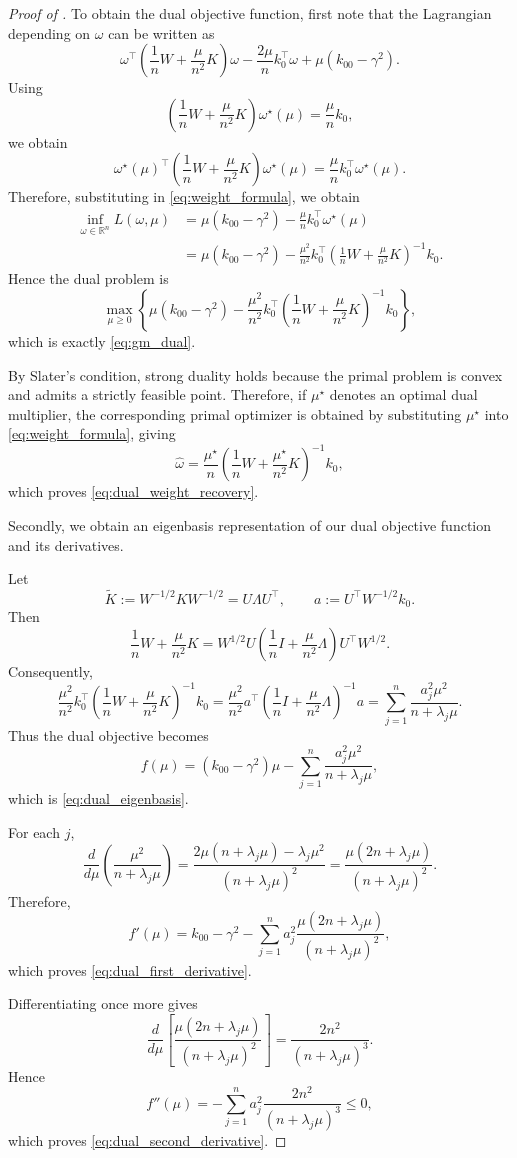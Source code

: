 \documentclass[11pt]{article}
\newcommand{\R}{\mathbb{R}}
\begin{document}
\begin{proof}[Proof of ]
\indent To obtain the dual objective function, first note that
the Lagrangian depending on $\omega$ can be written as
\[
  \omega^\top \left(\frac1nW+\frac\mu{n^2}K \right)\omega
  -
  \frac{2\mu}{n}k_0^\top\omega + \mu(k_{00}-\gamma^2).
\]
Using
\[
  \left(\frac1nW+\frac\mu{n^2}K \right)\omega^\star(\mu)
  =
  \frac\mu n k_0,
\]
we obtain
\[
  \omega^\star(\mu)^\top
  \left(\frac1nW+\frac\mu{n^2}K \right)
  \omega^\star(\mu)
  =
  \frac\mu n
  k_0^\top\omega^\star(\mu).
\]
Therefore, substituting in \eqref{eq:weight_formula}, we obtain 
\begin{align*}
  \inf_{\omega\in\R^n}L(\omega,\mu)
  &=
  \mu(k_{00}-\gamma^2)
  -
  \frac\mu n
  k_0^\top\omega^\star(\mu)
  \\
  &=
  \mu(k_{00}-\gamma^2)
  -
  \frac{\mu^2}{n^2}
  k_0^\top
  \left(
  \frac1nW+\frac\mu{n^2}K
  \right)^{-1}
  k_0.
\end{align*}
Hence the dual problem is
\[
  \max_{\mu\geq0}
  \left\{
  \mu(k_{00}-\gamma^2)
  -
  \frac{\mu^2}{n^2}
  k_0^\top
  \left(
  \frac1nW+\frac\mu{n^2}K
  \right)^{-1}
  k_0
  \right\},
\]
which is exactly \eqref{eq:gm_dual}.

By Slater's condition, strong duality holds because the primal problem
is convex and admits a strictly feasible point. Therefore, if
$\mu^\star$ denotes an optimal dual multiplier, the corresponding
primal optimizer is obtained by substituting $\mu^\star$ into
\eqref{eq:weight_formula}, giving
\[
  \widehat\omega
  =
  \frac{\mu^\star}{n}
  \left(
  \frac1nW+\frac{\mu^\star}{n^2}K
  \right)^{-1}
  k_0,
\]
which proves \eqref{eq:dual_weight_recovery}.

\medskip
\noindent
Secondly, we obtain an eigenbasis representation of our dual objective function and its derivatives.

Let
\[
 \widetilde K:=W^{-1/2}KW^{-1/2}=U\Lambda U^\top,
 \qquad a:=U^\top W^{-1/2}k_0.
\]
Then
\[
 \frac1nW+\frac\mu{n^2}K
 =W^{1/2}U\left(\frac1nI+\frac\mu{n^2}\Lambda\right)U^\top W^{1/2}.
\]
Consequently,
\[
 \frac{\mu^2}{n^2}k_0^\top
 \left(\frac1nW+\frac\mu{n^2}K\right)^{-1}k_0
 =\frac{\mu^2}{n^2}a^\top
 \left(\frac1nI+\frac\mu{n^2}\Lambda\right)^{-1}a
 =\sum_{j=1}^n\frac{a_j^2\mu^2}{n+\lambda_j\mu}.
\]
Thus the dual objective becomes
\[
  f(\mu)
  =
  (k_{00}-\gamma^2)\mu
  -
  \sum_{j=1}^n
  \frac{a_j^2\mu^2}{n+\lambda_j\mu},
\]
which is \eqref{eq:dual_eigenbasis}.

For each $j$,
\[
  \frac{d}{d\mu}
  \left(
  \frac{\mu^2}{n+\lambda_j\mu}
  \right)
  =
  \frac{
  2\mu(n+\lambda_j\mu)
  -
  \lambda_j\mu^2
  }{
  (n+\lambda_j\mu)^2
  }
  =
  \frac{
  \mu(2n+\lambda_j\mu)
  }{
  (n+\lambda_j\mu)^2
  }.
\]
Therefore,
\[
  f'(\mu)
  =
  k_{00}-\gamma^2
  -
  \sum_{j=1}^n
  a_j^2
  \frac{
  \mu(2n+\lambda_j\mu)
  }{
  (n+\lambda_j\mu)^2
  },
\]
which proves \eqref{eq:dual_first_derivative}.

Differentiating once more gives
\[
  \frac{d}{d\mu}
  \left[
  \frac{
  \mu(2n+\lambda_j\mu)
  }{
  (n+\lambda_j\mu)^2
  }
  \right]
  =
  \frac{2n^2}{(n+\lambda_j\mu)^3}.
\]
Hence
\[
  f''(\mu)
  =
  -
  \sum_{j=1}^n
  a_j^2
  \frac{2n^2}{(n+\lambda_j\mu)^3}
  \leq 0,
\]
which proves \eqref{eq:dual_second_derivative}. 
\end{proof}
\end{document}
